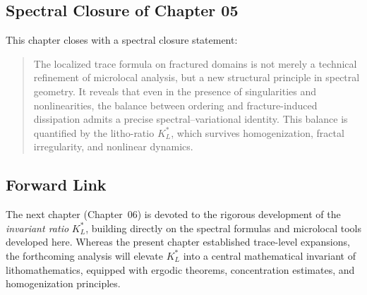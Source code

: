 \subsection{Spectral Closure of Chapter 05}

This chapter closes with a spectral closure statement:

\begin{quote}
  The localized trace formula on fractured domains is not merely a
  technical refinement of microlocal analysis, but a new structural
  principle in spectral geometry. It reveals that even in the presence
  of singularities and nonlinearities, the balance between ordering and
  fracture-induced dissipation admits a precise spectral–variational
  identity. This balance is quantified by the litho-ratio $K_L^*$,
  which survives homogenization, fractal irregularity, and nonlinear
  dynamics.
\end{quote}

\subsection*{Forward Link}

The next chapter (Chapter~06) is devoted to the rigorous development of
the \emph{invariant ratio} $K_L^*$, building directly on the spectral
formulas and microlocal tools developed here. Whereas the present
chapter established trace-level expansions, the forthcoming analysis
will elevate $K_L^*$ into a central mathematical invariant of
lithomathematics, equipped with ergodic theorems, concentration
estimates, and homogenization principles.
